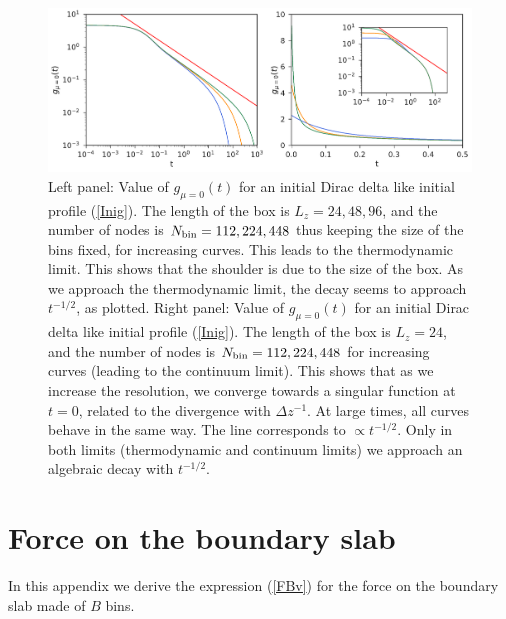 \documentclass[b5paper,openright,10pt]{book}
\begin{document}
\begin{appendices}
\begin{figure}[]
  \includegraphics[width=\linewidth]{Green}
  \caption[Visualization of the algebraic prediction of $g_{\mu}(t)$ in the thermodynamic and continuum limit]{Left panel: Value  of  $g_{\mu=0}(t)$ for  an  initial  Dirac delta  like
  initial profile (\ref{Inig}). The length of the box is $L_z=24,48,96
  $,  and the  number  of nodes  is  ${N_{\rm bin}}=112,224,448$  thus
  keeping  the size  of the  bins fixed,  for increasing  curves. This
  leads to  the thermodynamic limit.  This shows that the  shoulder is
  due to the size of the  box. As we approach the thermodynamic limit,
  the decay seems to approach $t^{-1/2}$, as plotted.
  Right panel: Value  of $g_{\mu=0}(t)$  for an  initial Dirac  delta like
    initial profile (\ref{Inig}).  The length  of the box is $L_z=24$,
    and the number  of nodes is ${N_{\rm bin}}=112,224,448$  for increasing curves
    (leading to the  continuum limit). This shows that  as we increase
    the resolution, we converge towards  a singular function at $t=0$,
    related to  the divergence with  $\Delta z^{-1}$. At  large times,
    all  curves  behave in  the  same  way.  The line  corresponds  to
    $\propto  t^{-1/2}$.  Only  in   both  limits  (thermodynamic  and
    continuum   limits)   we   approach  an   algebraic   decay   with
    $t^{-1/2}$. }
\label{GreenFunction}
\end{figure}




\chapter{Force on the boundary slab}
\label{App:1}
In this appendix we derive the expression (\ref{FBv}) for the force on the boundary slab made
of $B$ bins. 


\end{appendices}
\end{document}
